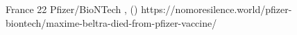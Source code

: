           {France}
          {22}
          {Pfizer/BioNTech}
          {}
          {
            ,
             ()
          }
          {https://nomoresilence.world/pfizer-biontech/maxime-beltra-died-from-pfizer-vaccine/}

